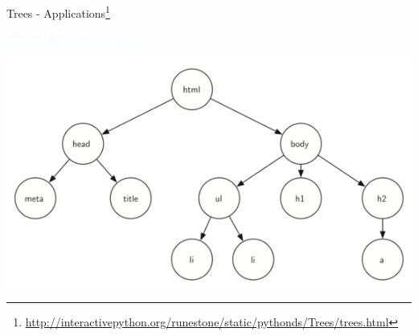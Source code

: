 \documentclass{beamer}
\newcommand{\tblue}[1]{{\Large {\textcolor{azure}{#1}}}}
\begin{document}
\begin{frame}{Trees - Applications\footnote{\url{http://interactivepython.org/runestone/static/pythonds/Trees/trees.html}}}

\tblue{HTML DOM (Parse) Tree:}
\begin{center}
    \includegraphics[scale=0.75]{treesEg4.png}
\end{center}
\end{frame}
\end{document}
